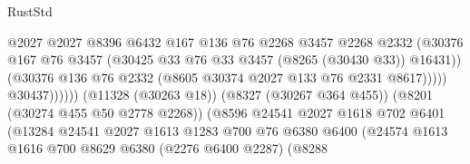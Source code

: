 \begin{lexlean}{RustStd}
\begin{coremodule}
{\begin{coremodule}
{{{{{{{{{{{{{{{{{{{{{{{{{{{{{{{{{{{{{{{{{{{{{{{{{{{{{{                                              @2027
                                              @2027
                                              @8396
                                              @6432
                                              @167
                                              @136
                                              @76
                                              @2268
                                              @3457
                                              @2268
                                              @2332
                                              (@30376
                                                @167
                                                @76
                                                @3457
                                                (@30425
                                                  @33
                                                  @76
                                                  @33
                                                  @3457
                                                  (@8265 (@30430 @33))
                                                  @16431))
                                              (@30376
                                                @136
                                                @76
                                                @2332
                                                (@8605 @30374 @2027 @133 @76 @2331 @8617)))))
                                        @30437))))))
                            (@11328 (@30263 @18))
                            (@8327 (@30267 @364 @455))
                            (@8201 (@30274 @455 @50 @2778 @2268))
                            (@8596
                              @24541
                              @2027
                              @1618
                              @702
                              @6401
                              (@13284
                                @24541
                                @2027
                                @1613
                                @1283
                                @700
                                @76
                                @6380
                                @6400
                                (@24574
                                  @1613
                                  @1616
                                  @700
                                  @8629
                                  @6380
                                  (@2276 @6400 @2287)
                                  (@8288
}}}}}}}}}}}}}}}}}}}}}}}}}}}}}}}}}}}}}}}}}}}}}}}}}}}}}}
\end{coremodule}}
\end{coremodule}
\end{lexlean}
